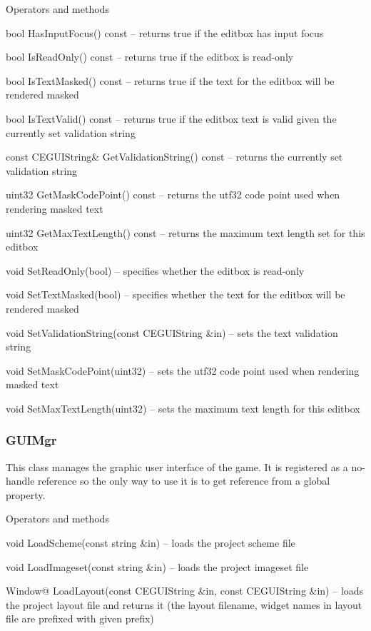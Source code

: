 \begin{titled-itemize}{Operators and methods}
  \item bool HasInputFocus() const -- returns true if the editbox has input focus
  \item bool IsReadOnly() const -- returns true if the editbox is read-only
  \item bool IsTextMasked() const -- returns true if the text for the editbox will be rendered masked
  \item bool IsTextValid() const -- returns true if the editbox text is valid given the currently set
 validation string
  \item const CEGUIString\& GetValidationString() const -- returns the currently set validation string
  \item uint32 GetMaskCodePoint() const -- returns the utf32 code point used when rendering masked text
  \item uint32 GetMaxTextLength() const -- returns the maximum text length set for this editbox
  \item void SetReadOnly(bool) -- specifies whether the editbox is read-only
  \item void SetTextMasked(bool) -- specifies whether the text for the editbox will be rendered masked
  \item void SetValidationString(const CEGUIString \&in) -- sets the text validation string
  \item void SetMaskCodePoint(uint32) -- sets the utf32 code point used when rendering masked text
  \item void SetMaxTextLength(uint32) -- sets the maximum text length for this editbox
\end{titled-itemize}

\subsubsection{GUIMgr}

This class manages the graphic user interface of the game. It is registered as a no-handle reference so the only way to use it is to get reference from a global property.

\begin{titled-itemize}{Operators and methods}
  \item void LoadScheme(const string \&in) -- loads the project scheme file
  \item void LoadImageset(const string \&in) -- loads the project imageset file
  \item Window@ LoadLayout(const CEGUIString \&in, const CEGUIString \&in) -- loads the project layout file and returns it (the layout filename, widget names in layout file are prefixed with given prefix)
\end{titled-itemize}

